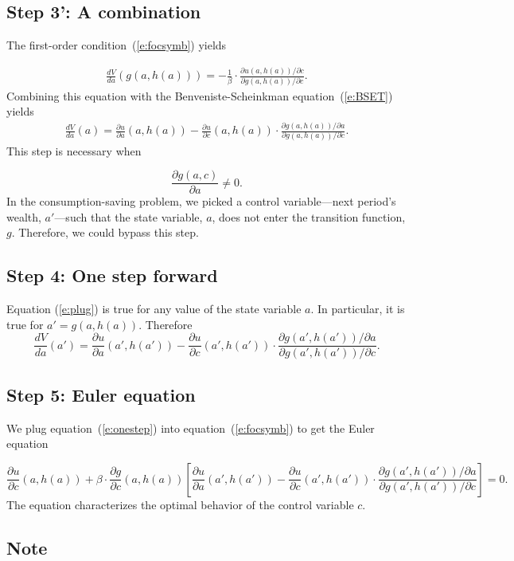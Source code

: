 \documentclass{article}
\begin{document}
\subsection{Step 3': A combination}

The first-order condition~(\ref{e:focsymb}) yields
\wcSpan*[id=equation-37]{}

\[
\begin{align*}
\frac{d V}{d a}(g(a,h(a)))=-\frac{1}{\beta}\cdot \frac{\partial u(a,h(a))/\partial c}{\partial g(a,h(a))/\partial c}.\tag{37}
\end{align*}
\]
Combining this equation with the Benveniste-Scheinkman equation~(\ref{e:BSET}) yields
\wcSpan*[id=equation-38]{}
\setcounter{tpequation}{37}\label{e:plug}
\[
\begin{align*}
\frac{d V}{d a}(a)=\frac{\partial u}{\partial a}(a,h(a))-\frac{\partial u}{\partial c}(a,h(a))\cdot \frac{\partial g(a,h(a))/\partial a}{\partial g(a,h(a))/\partial c}.\tag{38}
\end{align*}
\]
This step is necessary when 

\[
\frac{\partial g(a,c)}{\partial a}\neq 0.
\] In the consumption-saving problem, we picked a control variable---next period's wealth, $a'$---such that the state variable, $a$, does not enter the transition function, $g$. Therefore, we could bypass this step.

\subsection{Step 4: One step forward}

Equation (\ref{e:plug}) is true for any value of the state variable $a$. In particular, it is true for $a'=g(a,h(a))$. Therefore
\wcSpan*[id=equation-39]{}
\setcounter{tpequation}{38}\label{e:onestep}
\[
\frac{d V}{d a}(a')=\frac{\partial u}{\partial a}(a',h(a'))-\frac{\partial u}{\partial c}(a',h(a'))\cdot \frac{\partial g(a',h(a'))/\partial a}{\partial g(a',h(a'))/\partial c}.\tag{39}
\]

\subsection{Step 5: Euler equation}

We plug equation~(\ref{e:onestep}) into equation~(\ref{e:focsymb}) to get the Euler equation

\[
\frac{\partial u}{\partial c}(a,h(a))+\beta \cdot \frac{\partial g}{\partial c}(a,h(a)) \left[\frac{\partial u}{\partial a}(a',h(a'))-\frac{\partial u}{\partial c}(a',h(a')) \cdot \frac{\partial g(a',h(a'))/\partial a}{\partial g(a',h(a'))/\partial c}\right]=0.
\]
The equation characterizes the optimal behavior of the control variable $c$.


\subsection*{Note}
\wcTpListof[selector=tp-note]{}
\end{document}
